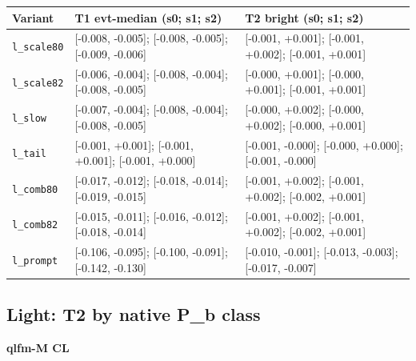 \documentclass[10pt,a4paper]{article}
\begin{document}
\begin{center}\small
\setlength{\tabcolsep}{3pt}\renewcommand{\arraystretch}{1.15}
\begin{tabularx}{\linewidth}{LLL}
\toprule
\textbf{Variant} & \textbf{T1 evt-median (s0; s1; s2)} & \textbf{T2 bright (s0; s1; s2)} \\
\midrule
\texttt{l\_\allowbreak{}scale80} & [-0.008, -0.005]; [-0.008, -0.005]; [-0.009, -0.006] & [-0.001, +0.001]; [-0.001, +0.002]; [-0.001, +0.001] \\
\texttt{l\_\allowbreak{}scale82} & [-0.006, -0.004]; [-0.008, -0.004]; [-0.008, -0.005] & [-0.000, +0.001]; [-0.000, +0.001]; [-0.001, +0.001] \\
\texttt{l\_\allowbreak{}slow} & [-0.007, -0.004]; [-0.008, -0.004]; [-0.008, -0.005] & [-0.000, +0.002]; [-0.000, +0.002]; [-0.000, +0.001] \\
\texttt{l\_\allowbreak{}tail} & [-0.001, +0.001]; [-0.001, +0.001]; [-0.001, +0.000] & [-0.001, -0.000]; [-0.000, +0.000]; [-0.001, -0.000] \\
\texttt{l\_\allowbreak{}comb80} & [-0.017, -0.012]; [-0.018, -0.014]; [-0.019, -0.015] & [-0.001, +0.002]; [-0.001, +0.002]; [-0.002, +0.001] \\
\texttt{l\_\allowbreak{}comb82} & [-0.015, -0.011]; [-0.016, -0.012]; [-0.018, -0.014] & [-0.001, +0.002]; [-0.001, +0.002]; [-0.002, +0.001] \\
\texttt{l\_\allowbreak{}prompt} & [-0.106, -0.095]; [-0.100, -0.091]; [-0.142, -0.130] & [-0.010, -0.001]; [-0.013, -0.003]; [-0.017, -0.007] \\
\bottomrule
\end{tabularx}
\end{center}
\subsection{Light: T2 by native P\_b class}
\textbf{qlfm-M CL}
\end{document}
